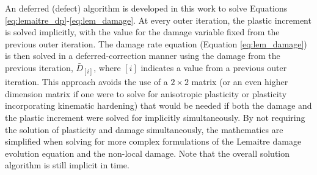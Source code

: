\documentclass[sn-mathphys,Numbered]{sn-jnl}%
\begin{document}
An deferred (defect) algorithm is developed in this work to solve Equations \ref{eq:lemaitre_dp}-\ref{eq:lem_damage}.
At every outer iteration, the plastic increment is solved implicitly, with the value for the damage variable fixed from the previous outer iteration.
The damage rate equation (Equation \ref{eq:lem_damage}) is then solved in a deferred-correction manner using the damage from the previous iteration, $\bar{D}_{[i]}$, where $[i]$ indicates a value from a previous outer iteration.
This approach avoids the use of a $2 \times 2$ matrix (or an even higher dimension matrix if one were to solve for anisotropic plasticity or plasticity incorporating kinematic hardening) that would be needed if both the damage and the plastic increment were solved for implicitly simultaneously.
By not requiring the solution of plasticity and damage simultaneously, the mathematics are simplified when solving for more complex formulations of the Lemaitre damage evolution equation and the non-local damage.
Note that the overall solution algorithm is still implicit in time.

%


\end{document}

